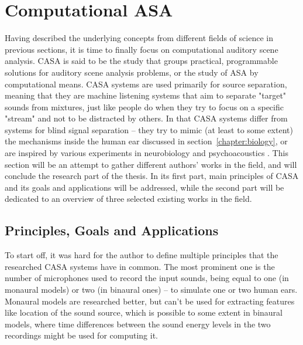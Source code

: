 \section{Computational ASA}\label{chapter:casa}

Having described the underlying concepts from different fields of science in previous sections, it is time to finally focus on computational auditory scene analysis. CASA is said to be the study that groups practical, programmable solutions for auditory scene analysis problems, or the study of ASA by computational means. CASA systems are used primarily for source se\-pa\-ra\-tion, meaning that they are machine listening systems that aim to separate "target" sounds from mixtures, just like people do when they try to focus on a specific "stream" and not to be distracted by others. In that CASA systems differ from systems for blind signal separation – they try to mimic (at least to some extent) the mechanisms inside the human ear discussed in section~\ref{chapter:biology}, or are inspired by various experiments in neurobiology and psychoacoustics \cite{VanDerKouwe2001}. This section will be an attempt to gather different authors' works in the field, and will conclude the research part of the thesis. In its first part, main principles of CASA and its goals and applications will be addressed, while the second part will be dedicated to an overview of three selected existing works in the field.

\subsection{Principles, Goals and Applications}

To start off, it was hard for the author to define multiple principles that the researched CASA systems have in common. The most prominent one is the number of microphones used to record the input sounds, being equal to one (in monaural models) or two (in binaural ones) -- to simulate one or two human ears. Monaural models are researched better, but can't be used for extracting features like location of the sound source, which is possible to some extent in binaural models, where time differences between the sound energy levels in the two recordings might be used for computing it.\\

